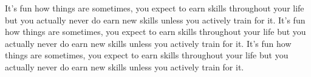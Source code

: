 \documentclass{amsart}
\begin{document}
It's fun how things are sometimes, you expect to earn skills throughout your life
but you actually never do earn new skills unless you actively train for it.
\twocolumn
It's fun how things are sometimes, you expect to earn skills throughout your life
but you actually never do earn new skills unless you actively train for it.
\onecolumn
It's fun how things are sometimes, you expect to earn skills throughout your life
but you actually never do earn new skills unless you actively train for it.
\end{document}
